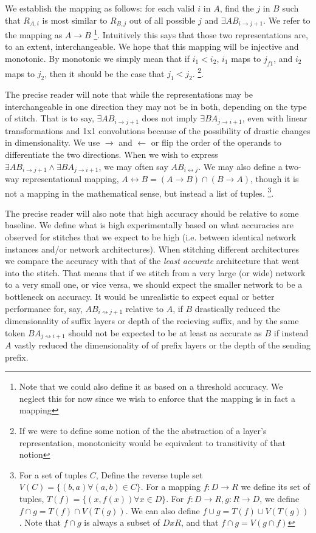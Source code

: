 \documentclass{article} %
\begin{document}
We establish the mapping as follows: for each valid \(i\) in \(A\), find the \(j\) in \(B\)
such that \(R_{A,i}\) is most similar to \(R_{B,j}\) out of all possible \(j\) and
\(\exists AB_{i \rightarrow j+1}\). We refer to the mapping as \(A \rightarrow B\)
\footnote{Note that we could also define it as based on a threshold accuracy.
We neglect this for now since we wish to enforce that the mapping is in fact a mapping}.
Intuitively this says that those two representations are, to an extent, interchangeable.
We hope that this mapping will be injective and monotonic.
By monotonic we simply mean that if \(i_{1} < i_{2}\), \(i_{1}\) maps to \(j_{f1}\),
and \(i_{2}\) maps to \(j_{2}\), then it should be the case that \(j_{1} < j_{2}\).
\footnote{If we were to define some notion of the the abstraction of a layer's
representation, monotonicity would be equivalent to transitivity of that notion}.

The precise reader will note that while the representations may be interchangeable in one direction
they may not be in both, depending on the type of stitch. That is to say,  \(\exists AB_{i \rightarrow j+1}\)
does not imply \(\exists BA_{j \rightarrow i+1}\), even with linear transformations and 1x1 convolutions
because of the possibility of drastic changes in dimensionality. We use \(\rightarrow\) and \(\leftarrow\)
or flip the order of the operands to differentiate the two directions.
When we wish to express \(\exists AB_{i \rightarrow j+1} \land \exists BA_{j \rightarrow i+1}\),
we may often say \(AB_{i \leftrightarrow j}\). We may also define a two-way representational mapping,
\(A \leftrightarrow B = (A \rightarrow B) \cap (B \rightarrow A)\), though it is not a mapping
in the mathematical sense, but instead a list of tuples.
\footnote{For a set of tuples \(C\), Define the reverse tuple set \(V(C) = \{(b, a) \forall (a, b) \in C\}\).
For a mapping \(f: D \to R\) we define its set of tuples, \(T(f) = \{(x, f(x)) \forall x \in D\}\).
For \(f: D \to R, g: R \to D\), we define \(f \cap g = T(f) \cap V(T(g))\). We can also define
\(f \cup g = T(f) \cup V(T(g))\). Note that \(f \cap g\) is always a subset of \(D x R\), and
that \(f \cap g = V(g \cap f)\)}.

The precise reader will also note that high accuracy should be relative to some baseline. We define what is high
experimentally based on what accuracies are observed for stitches that we expect to be high (i.e. between identical
network instances and/or network architectures). When stitching different architectures we compare the accuracy
with that of the \emph{least accurate} architecture that went into the stitch. That means that if we stitch from
a very large (or wide) network to a very small one, or vice versa, we should expect the smaller network to be a
bottleneck on accuracy. It would be unrealistic to expect equal or better performance for, say,
\(AB_{i \rightsquigarrow j+1}\) relative to \(A\), if \(B\) drastically reduced the dimensionality of suffix layers or depth of the recieving 
suffix, and by the same token \(BA_{j \rightsquigarrow i+1}\) should not be expected to be at least as accurate as \(B\)
if instead \(A\) vastly reduced the dimensionality of of prefix layers or the depth of the sending prefix.
\end{document}
